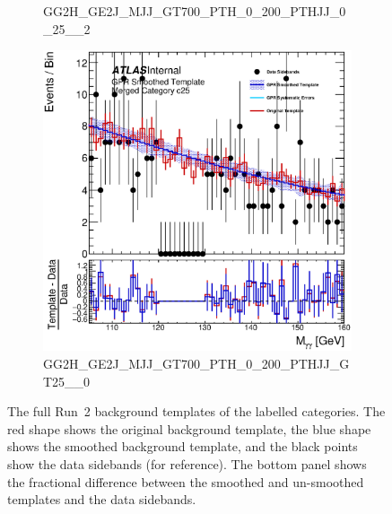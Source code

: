 \begin{figure}
\begin{center}
\begin{subfigure}[T]{0.49\linewidth}
	\caption{\tiny{GG2H\_GE2J\_MJJ\_GT700\_PTH\_0\_200\_PTHJJ\_0\_25\_\_2}}
\end{subfigure}
\begin{subfigure}[T]{0.49\linewidth}
	\centering
	\includegraphics[width=\linewidth]{figures/background/gpr/coupCatTemplates/GPR_Smoothed_Plot_hmgg_c25.eps}
	\caption{\tiny{GG2H\_GE2J\_MJJ\_GT700\_PTH\_0\_200\_PTHJJ\_GT25\_\_0}}
\end{subfigure}
\caption{The full Run~2 background templates of the labelled categories. The red shape shows the original background template, the blue shape shows the smoothed background template, and the black points show the data sidebands (for reference). The bottom panel shows the fractional difference between the smoothed and un-smoothed templates and the data sidebands. }
\label{fig:gpr_coupcat_6}
\end{center}
\end{figure}

